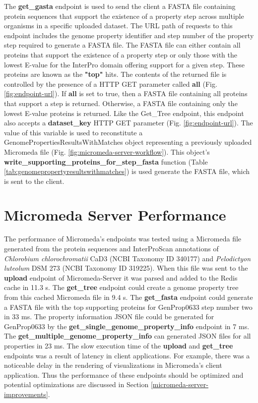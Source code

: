 The \textbf{get\_gasta} endpoint is used to send the client a FASTA file containing protein sequences that support the existence of a property step across multiple organisms in a specific uploaded dataset. The URL path of requests to this endpoint includes the genome property identifier and step number of the property step required to generate a FASTA file. The FASTA file can either contain all proteins that support the existence of a property step or only those with the lowest E-value for the InterPro domain offering support for a given step. These proteins are known as the \textbf{"top"} hits. The contents of the returned file is controlled by the presence of a HTTP GET parameter called \textbf{all} (Fig. \ref{fig:endpoint-url}). If \textbf{all} is set to true, then a FASTA file containing all proteins that support a step is returned. Otherwise, a FASTA file containing only the lowest E-value proteins is returned. Like the Get\_Tree endpoint, this endpoint also accepts a \textbf{dataset\_key} HTTP GET parameter (Fig. \ref{fig:endpoint-url}). The value of this variable is used to reconstitute a GenomePropertiesResultsWithMatches object representing a previously uploaded Micromeda file (Fig. \ref{fig:micromeda-server-workflow}). This object's \textbf{write\_supporting\_proteins\_for\_step\_fasta} function (Table \ref{tab:genomepropertyresultswithmatches}) is used generate the FASTA file, which is sent to the client.

\section{Micromeda Server Performance} \label{micromeda-server-performance}

The performance of Micromeda's endpoints was tested using a Micromeda file generated from the protein sequences and InterProScan annotations of \textit{Chlorobium chlorochromatii} CaD3 (NCBI Taxonomy ID 340177) and \textit{Pelodictyon luteolum} DSM 273 (NCBI Taxonomy ID 319225). When this file was sent to the \textbf{upload} endpoint of Micromeda-Server it was parsed and added to the Redis cache in 11.3  s. The \textbf{get\_tree} endpoint could create a genome property tree from this cached Micromeda file in 9.4  s. The \textbf{get\_fasta} endpoint could generate a FASTA file with the top supporting proteins for GenProp0633 step number two in 33  ms. The property information JSON file could be generated for GenProp0633 by the \textbf{get\_single\_genome\_property\_info} endpoint in 7  ms. The \textbf{get\_multiple\_genome\_property\_info} can generated JSON files for all properties in 23  ms. The slow execution time of the \textbf{upload} and \textbf{get\_tree} endpoints was a result of latency in client applications. For example, there was a noticeable delay in the rendering of visualizations in Micromeda's client application. Thus the performance of these endpoints should be optimized and potential optimizations are discussed in Section \ref{micromeda-server-improvements}.

